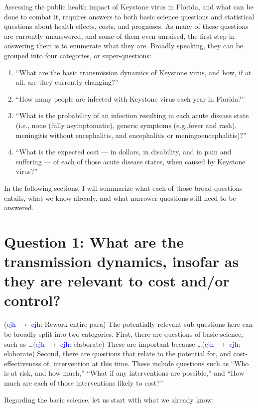 \documentclass[12pt]{article}
\newcommand{\cjh}{\textcolor{blue}{cjh}}
\newcommand{\msg}[3]{(#1 $\rightarrow$ #2: #3)}
\newcommand{\mcc}[1]{\msg\cjh\cjh{#1}}
\begin{document}
        Assessing the public health impact of Keystone virus in Florida, and what can be done to combat it, requires answers to both basic science questions and statistical questions about health effects, costs, and prognoses. As many of these questions are currently unanswered, and some of them even unraised, the first step in answering them is to enumerate what they are. Broadly speaking, they can be grouped into four categories, or super-questions:
        \begin{enumerate}
            \item ``What are the basic transmission dynamics of Keystone virus, and how, if at all, are they currently changing?''
            \item ``How many people are infected with Keystone virus each year in Florida?''
            \item ``What is the probability of an infection resulting in each acute disease state (i.e., none (fully asymptomatic), generic symptoms (e.g.,fever and rash), meningitis without encephalitis, and encephalitis or meningoencephalitis)?''
            \item ``What is the expected cost --- in dollars, in disability, and in pain and suffering --- of each of those acute disease states, when caused by Keystone virus?''
        \end{enumerate}

        In the following sections, I will summarize what each of those broad questions entails, what we know already, and what narrower questions still need to be answered.

    \section[Transmission dynamics]{Question 1: What are the transmission dynamics, insofar as they are relevant to cost and/or control?}
        \mcc{Rework entire para}
        The potentially relevant sub-questions here can be broadly split into two categories. First, there are questions of basic science, such as \dots \mcc{elaborate} These are important because \dots \mcc{elaborate} Second, there are questions that relate to the potential for, and cost-effectiveness of, intervention at this time. These include questions such as ``Who is at risk, and how much,'' ``What if any interventions are possible,'' and ``How much are each of those interventions likely to cost?''

        Regarding the basic science, let us start with what we already know:
\end{document}
